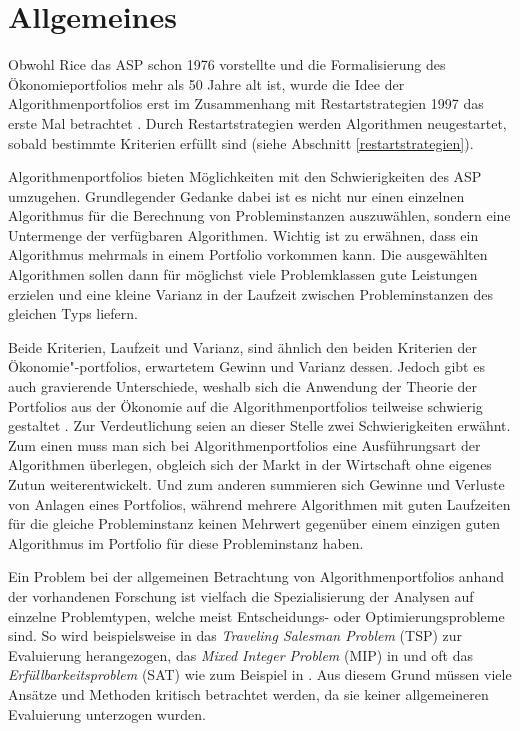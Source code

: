 \section{Allgemeines}

Obwohl Rice das ASP schon 1976 vorstellte und die Formalisierung des Ökonomieportfolios mehr als 50 Jahre alt ist, wurde die Idee der Algorithmenportfolios erst im Zusammenhang mit Restartstrategien 1997 das erste Mal betrachtet \cite{huberman97}. Durch Restartstrategien werden Algorithmen neugestartet, sobald bestimmte Kriterien erfüllt sind (siehe Abschnitt \ref{restartstrategien}).

Algorithmenportfolios bieten Möglichkeiten mit den Schwierigkeiten des ASP umzugehen. Grundlegender Gedanke dabei ist es nicht nur einen einzelnen Algorithmus für die Berechnung von Probleminstanzen auszuwählen, sondern eine Untermenge der verfügbaren Algorithmen. Wichtig ist zu erwähnen, dass ein Algorithmus mehrmals in einem Portfolio vorkommen kann. Die ausgewählten Algorithmen sollen dann für möglichst viele Problemklassen gute Leistungen erzielen und eine kleine Varianz in der Laufzeit zwischen Probleminstanzen des gleichen Typs liefern. 

Beide Kriterien, Laufzeit und Varianz, sind ähnlich den beiden Kriterien der Ökonomie"-portfolios, erwartetem Gewinn und Varianz dessen. Jedoch gibt es auch gravierende Unterschiede, weshalb sich die Anwendung der Theorie der Portfolios aus der Ökonomie auf die Algorithmenportfolios teilweise schwierig gestaltet \cite{gomesselman97}. Zur Verdeutlichung seien an dieser Stelle zwei Schwierigkeiten erwähnt. Zum einen muss man sich bei Algorithmenportfolios eine Ausführungsart der Algorithmen überlegen, obgleich sich der Markt in der Wirtschaft ohne eigenes Zutun weiterentwickelt. Und zum anderen summieren sich Gewinne und Verluste von Anlagen eines Portfolios, während mehrere Algorithmen mit guten Laufzeiten für die gleiche Probleminstanz keinen Mehrwert gegenüber einem einzigen guten Algorithmus im Portfolio für diese Probleminstanz haben.

Ein Problem bei der allgemeinen Betrachtung von Algorithmenportfolios anhand der vorhandenen Forschung ist vielfach die Spezialisierung der Analysen auf einzelne Problemtypen, welche meist Entscheidungs- oder Optimierungsprobleme sind. So wird beispielsweise in \cite{fukunaga99} das \textit{Traveling Salesman Problem} (TSP) zur Evaluierung herangezogen, das \textit{Mixed Integer Problem} (MIP) in \cite{gomesselman97} und oft das \textit{Erfüllbarkeitsproblem} (SAT) wie zum Beispiel in \cite{kautz02}. Aus diesem Grund müssen viele Ansätze und Methoden kritisch betrachtet werden, da sie keiner allgemeineren Evaluierung unterzogen wurden.

